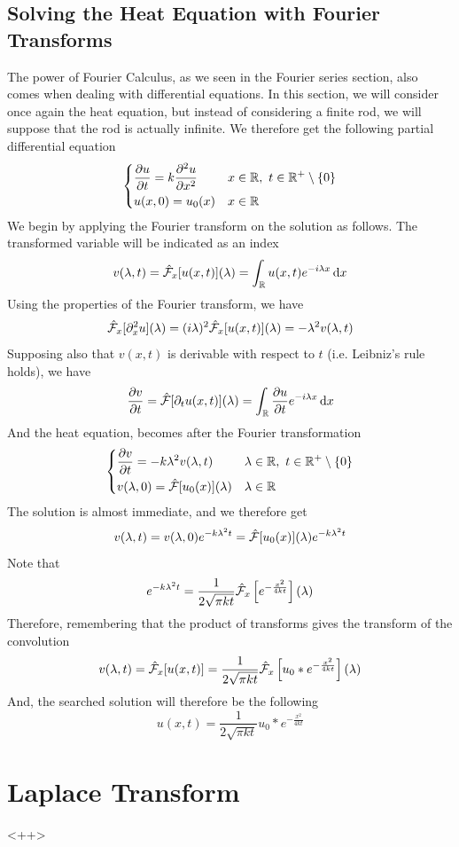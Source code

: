 \documentclass[../complete.tex]{subfiles}
\begin{document}
\subsection{Solving the Heat Equation with Fourier Transforms}
The power of Fourier Calculus, as we seen in the Fourier series section, also comes when dealing with differential equations. In this section, we will consider once again the heat equation, but instead of considering a finite rod, we will suppose that the rod is actually infinite. We therefore get the following partial differential equation
\begin{equation*}
	\begin{dcases}
		\pdv{u}{t}=k\pdv[2]{u}{x}&x\in\mathbb{R},\ t\in\mathbb{R}^+\setminus\{0\}\\
		u(x,0)=u_0(x)&x\in\mathbb{R}
	\end{dcases}
\end{equation*}
We begin by applying the Fourier transform on the solution as follows. The transformed variable will be indicated as an index
\begin{equation}
	v(\lambda,t)=\hat{\mathcal{F}}_x[u(x,t)](\lambda)=\int_{\mathbb{R}}^{}u(x,t)e^{-i\lambda x}\operatorname{d\!} x
	\label{eq:vlambdef}
\end{equation}
Using the properties of the Fourier transform, we have
\begin{equation*}
	\hat{\mathcal{F}}_x[\partial^2_xu](\lambda)=(i\lambda)^2\hat{\mathcal{F}}_x[u(x,t)](\lambda)=-\lambda^2v(\lambda,t)
\end{equation*}
Supposing also that $v(x,t)$ is derivable with respect to $t$ (i.e. Leibniz's rule holds), we have
\begin{equation*}
	\pdv{v}{t}=\hat{\mathcal{F}}[\partial_tu(x,t)](\lambda)=\int_{\mathbb{R}}^{}\pdv{u}{t}e^{-i\lambda x}\operatorname{d\!} x
\end{equation*}
And the heat equation, becomes after the Fourier transformation
\begin{equation}
	\begin{dcases}
		\pdv{v}{t}=-k\lambda^2v(\lambda,t)&\lambda\in\R,\ t\in\R^+\setminus\{0\}\\
		v(\lambda,0)=\fou[u_0(x)](\lambda)&\lambda\in\R
	\end{dcases}
	\label{eq:transformedheat}
\end{equation}
The solution is almost immediate, and we therefore get
\begin{equation*}
	v(\lambda,t)=v(\lambda,0)e^{-k\lambda^2t}=\hat{\mathcal{F}}[u_0(x)](\lambda)e^{-k\lambda^2t}
\end{equation*}
Note that
\begin{equation*}
	e^{-k\lambda^2t}=\frac{1}{2\sqrt{\pi kt}}\hat{\mathcal{F}}_x\left[ e^{-\frac{x^2}{4kt}} \right](\lambda)
\end{equation*}
Therefore, remembering that the product of transforms gives the transform of the convolution
\begin{equation*}
	v(\lambda,t)=\hat{\mathcal{F}}_x[u(x,t)]=\frac{1}{2\sqrt{\pi kt}}\hat{\mathcal{F}}_x\left[ u_0*e^{-\frac{x^2}{4kt}} \right](\lambda)
\end{equation*}
And, the searched solution will therefore be the following
\begin{equation*}
	u(x,t)=\frac{1}{2\sqrt{\pi kt}}u_0*e^{-\frac{x^2}{4kt}}
\end{equation*}
\section{Laplace Transform}
<++>
\end{document}
